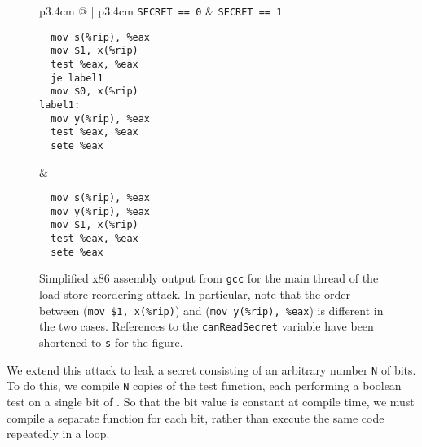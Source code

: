 \documentclass[conference]{IEEEtran}
\theoremstyle{plain}
\theoremstyle{definition}
\newcommand{\ignore}[1]{}
\begin{document}
\begin{figure}
  \begin{tabular}{p{3.4cm} @{\quad} | p{3.4cm}}
    \texttt{SECRET == 0} & \texttt{SECRET == 1} \\ \hline
\begin{verbatim}
  mov s(%rip), %eax
  mov $1, x(%rip)
  test %eax, %eax
  je label1
  mov $0, x(%rip)
label1:
  mov y(%rip), %eax
  test %eax, %eax
  sete %eax
\end{verbatim}
  &
\begin{verbatim}
  mov s(%rip), %eax
  mov y(%rip), %eax
  mov $1, x(%rip)
  test %eax, %eax
  sete %eax
\end{verbatim}
  \end{tabular}
  \caption{
    Simplified x86 assembly output from \texttt{gcc} for the main thread of
    the load-store reordering attack.
    In particular, note that the order between (\texttt{mov \$1, x(\%rip)})
    and (\texttt{mov y(\%rip), \%eax}) is different in the two cases.
    References to the \texttt{canReadSecret} variable have been shortened to
    \texttt{s} for the figure.
  }
  \label{fig:lsr-asm}
\end{figure}

We extend this attack to leak a secret consisting of an arbitrary number
\verb|N| of bits.
To do this, we compile \verb|N| copies of the test function, each
performing a boolean test on a single bit of {\SEC}.
So that the bit value is
constant at compile time, we must compile a separate function for each bit, rather than execute the same
code repeatedly in a loop.
\ignore{
The function used for reading the \verb|k|th bit is as follows (for
\verb|N <= 64|):
\[\begin{array}[t]{@{}l}
  \VAR x\GETS0\SEMI \VAR y\GETS0\SEMI\\\quad
    y\GETS x
  \PAR\begin{array}[t]{@{}l}
    x\GETS 1\SEMI\\
    \IF(\texttt{canReadSecret})\THEN x\GETS\texttt{(\SEC\, \& (1 << k)) ? 1 : 0}\SEMI\FI\\
    \IF(y > 0)\THEN \RETURN 0
    \brELSE \RETURN 1\FI
\end{array}\end{array}\]
Following the same analysis as above, this function will always return $1$
if {\SEC} is $1$, but may return $0$ if {\SEC} is $0$.
The extension of the attack to the general case with truly arbitrary \verb|N|
is straightforward; {\SEC} becomes an array of 64-bit values, and we use
\verb|k / 64| and \verb|1 << (k & 63)| as the array index and bitmask
respectively.
}
\end{document}
